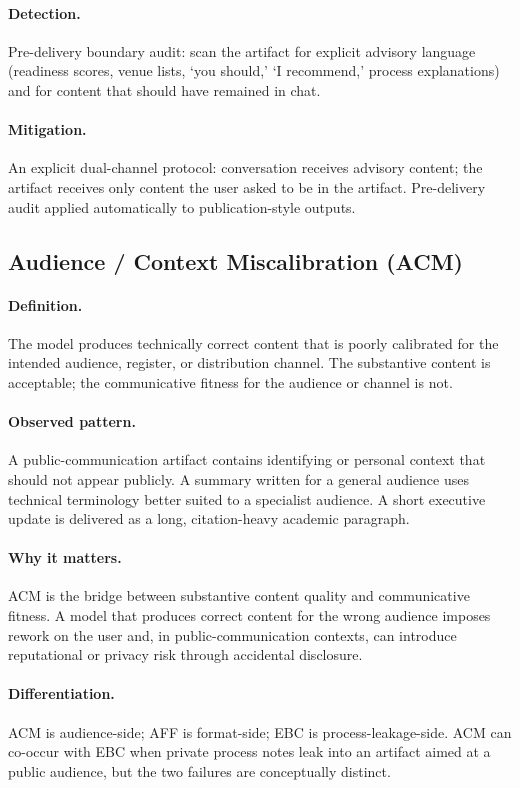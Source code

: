 \documentclass[11pt]{article}
\begin{document}
\paragraph{Detection.} Pre-delivery boundary audit: scan the artifact for explicit advisory language (readiness scores, venue lists, `you should,' `I recommend,' process explanations) and for content that should have remained in chat.

\paragraph{Mitigation.} An explicit dual-channel protocol: conversation receives advisory content; the artifact receives only content the user asked to be in the artifact. Pre-delivery audit applied automatically to publication-style outputs.

\subsection{Audience / Context Miscalibration (ACM)}
\paragraph{Definition.} The model produces technically correct content that is poorly calibrated for the intended audience, register, or distribution channel. The substantive content is acceptable; the communicative fitness for the audience or channel is not.

\paragraph{Observed pattern.} A public-communication artifact contains identifying or personal context that should not appear publicly. A summary written for a general audience uses technical terminology better suited to a specialist audience. A short executive update is delivered as a long, citation-heavy academic paragraph.

\paragraph{Why it matters.} ACM is the bridge between substantive content quality and communicative fitness. A model that produces correct content for the wrong audience imposes rework on the user and, in public-communication contexts, can introduce reputational or privacy risk through accidental disclosure.

\paragraph{Differentiation.} ACM is audience-side; AFF is format-side; EBC is process-leakage-side. ACM can co-occur with EBC when private process notes leak into an artifact aimed at a public audience, but the two failures are conceptually distinct.
\end{document}
